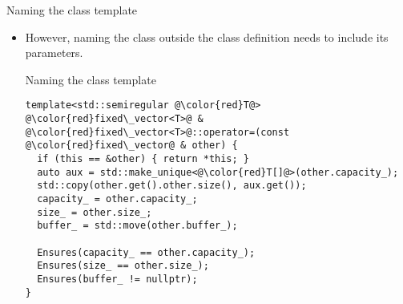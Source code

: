 \begin{frame}[t,fragile]{Naming the class template}
\begin{itemize}
  \item However, naming the class outside the class definition needs to include
        its parameters.

\begin{block}{Naming the class template}
\begin{lstlisting}[escapechar=@]
template<std::semiregular @\color{red}T@>
@\color{red}fixed\_vector<T>@ & @\color{red}fixed\_vector<T>@::operator=(const @\color{red}fixed\_vector@ & other) {
  if (this == &other) { return *this; }
  auto aux = std::make_unique<@\color{red}T[]@>(other.capacity_);
  std::copy(other.get().other.size(), aux.get());
  capacity_ = other.capacity_;
  size_ = other.size_;
  buffer_ = std::move(other.buffer_);

  Ensures(capacity_ == other.capacity_);
  Ensures(size_ == other.size_);
  Ensures(buffer_ != nullptr);
}
\end{lstlisting}
\end{block}

\end{itemize}
\end{frame}
